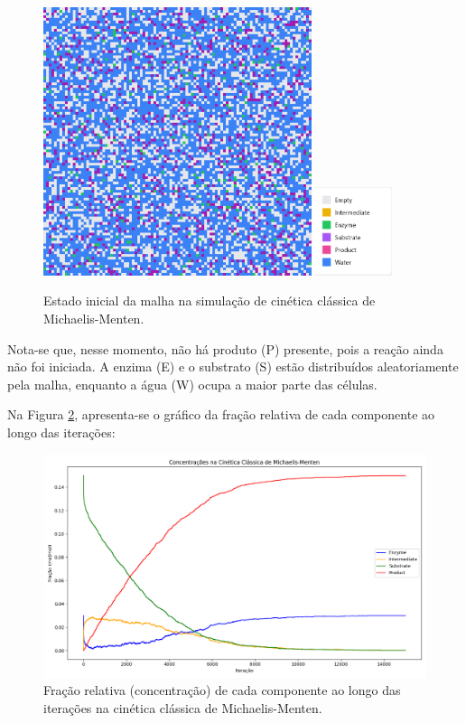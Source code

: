 \documentclass[12pt,oneside]{report}
\begin{document}
\begin{figure}[H]
    \centering
    \includegraphics[width=0.7\textwidth]{img/MM_initial_S0.png}
    \hspace{0.05\textwidth}
    \includegraphics[width=0.2\textwidth]{img/legend.png}
    \caption{\small Estado inicial da malha na simulação de cinética clássica de Michaelis-Menten.}
    \label{fig:MM_initial}
\end{figure}

Nota-se que, nesse momento, não há produto (P) presente, pois a reação ainda não foi iniciada. A enzima (E) e o substrato (S) estão distribuídos aleatoriamente pela malha, enquanto a água (W) ocupa a maior parte das células.

Na Figura \ref{fig:MM_conc}, apresenta-se o gráfico da fração relativa de cada componente ao longo das iterações:

\begin{figure}[H]
    \centering
    \includegraphics[width=1\textwidth]{img/MM_conc.png}
    \caption{\small Fração relativa (concentração) de cada componente ao longo das iterações na cinética clássica de Michaelis-Menten.}
    \label{fig:MM_conc}
\end{figure}
\end{document}
